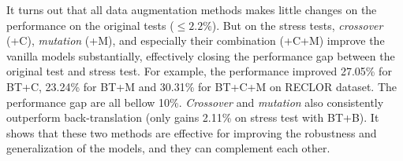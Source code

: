 It turns out that all data augmentation methods makes little changes on
the performance on the original tests ($\le 2.2\%$).
But on the stress tests,  \textit{crossover} (+C), \textit{mutation} (+M), 
and especially their combination (+C+M) improve the vanilla models substantially,
effectively closing the performance gap between the original test and stress test. 
For example, the performance improved 27.05\% for BT+C, 23.24\% for BT+M and 
30.31\% for BT+C+M on RECLOR dataset. The performance gap are all bellow 10\%. 
\textit{Crossover} and \textit{mutation} also 
consistently outperform back-translation (only gains 2.11\% on stress test with BT+B). 
It shows that these two methods are effective for improving 
the robustness and generalization of the models, 
and they can complement each other.





